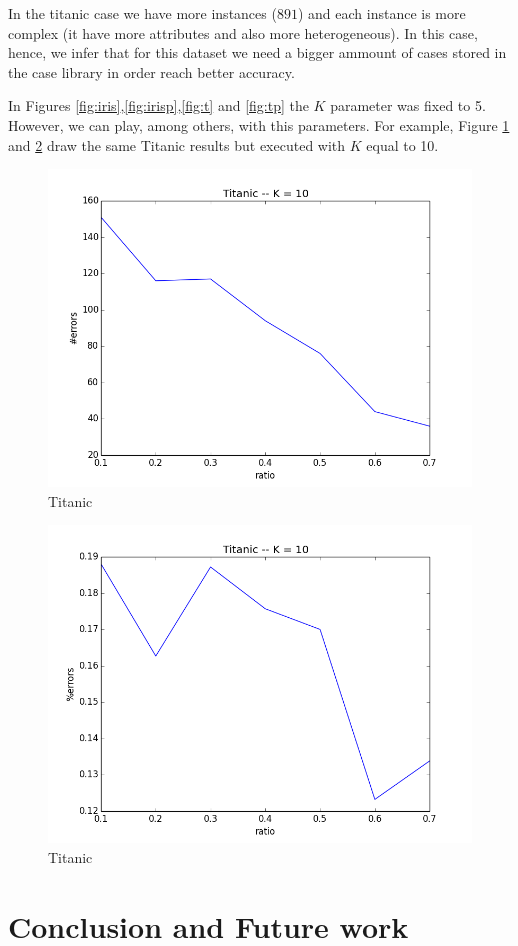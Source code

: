 \documentclass[11pt]{article}
\begin{document}
In the titanic case we have more instances ($891$) and each instance is more complex (it have more attributes and also more heterogeneous). In this case, hence, we infer that for this dataset we need a bigger ammount of cases stored in the case library in order reach better accuracy.

In Figures \ref{fig:iris},\ref{fig:irisp},\ref{fig:t} and \ref{fig:tp} the $K$ parameter was fixed to 5. However, we can play, among others, with this parameters. For example, Figure \ref{fig:tk} and \ref{fig:tkp} draw the same Titanic results but executed with $K$ equal to 10.

\begin{figure}[htb]
    \center
    \includegraphics[width=0.7\linewidth]{images/tk10}
    \caption{Titanic}
    \label{fig:tk}
\end{figure}

\begin{figure}[htb]
    \center
    \includegraphics[width=0.7\linewidth]{images/tk10_p_bo}
    \caption{Titanic}
    \label{fig:tkp}
\end{figure}

\section{Conclusion and Future work}
\end{document}
